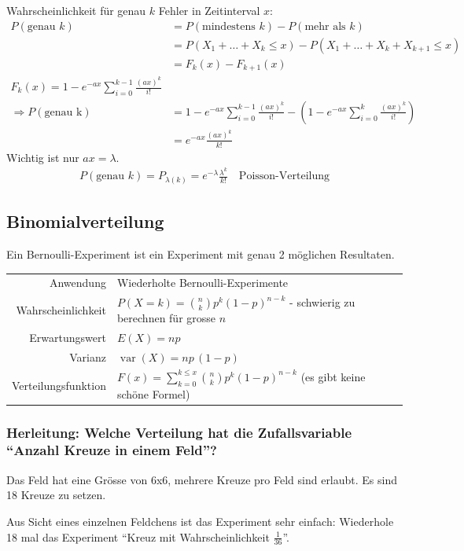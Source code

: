 \documentclass[10pt,a4paper]{scrartcl}
\newif\ifincludeDerivations
\DeclareMathOperator{\var}{var}
\begin{document}
Wahrscheinlichkeit für genau $k$ Fehler in Zeitinterval $x$:
\begin{align*}
P(\text{genau }k) & = P(\text{mindestens } k) - P(\text{mehr als } k) \\
& = P(X_1 + \dots + X_k \le x) - P(X_1 + \dots + X_k + X_{k+1} \le x) \\
& = F_k(x) - F_{k+1}(x) \\
F_k(x) = 1 - e^{-ax}\sum_{i=0}^{k-1} \frac{(ax)^k}{i!} \\
\Rightarrow P(\text{genau k}) &= 1 - e^{-ax} \sum_{i=0}^{k-1} \frac{(ax)^k}{i!} - 
  \left(1 - e^{-ax} \sum_{i=0}^{k} \frac{(ax)^k}{i!}\right) \\
  & = e^{-ax}\frac{(ax)^k}{k!}
\end{align*}
Wichtig ist nur $ax = \lambda$.
\begin{align*}
   P(\text{genau }k) = P_{\lambda(k)} = e^{-\lambda} \frac{\lambda^k}{k!} \quad\text{Poisson-Verteilung} 
\end{align*}
\fi

\subsection{Binomialverteilung}
Ein Bernoulli-Experiment ist ein Experiment mit genau 2 möglichen Resultaten.

\begin{tabular}{r p{\katalogSpaltezwei}}
Anwendung & Wiederholte Bernoulli-Experimente \\
Wahrscheinlichkeit & $P(X=k) = \binom{n}{k} p^k(1-p)^{n-k}$ - schwierig zu berechnen für grosse $n$\\
Erwartungswert & $ E(X) = np $ \\
Varianz & $\var(X) = np\,(1-p) $ \\
Verteilungsfunktion & $F(x) = \sum_{k=0}^{k \le x} \binom{n}{k} p^k(1-p)^{n-k}$ (es gibt keine schöne Formel)
\end{tabular} 

\ifincludeDerivations
\subsubsection{Herleitung: Welche Verteilung hat die Zufallsvariable ``Anzahl Kreuze in einem Feld''?}

Das Feld hat eine Grösse von 6x6, mehrere Kreuze pro Feld sind erlaubt. Es sind 18 Kreuze zu setzen. 

Aus Sicht eines einzelnen Feldchens ist das Experiment sehr einfach: Wiederhole 18 mal das Experiment ``Kreuz mit Wahrscheinlichkeit $\frac{1}{36}$''.
\end{document}
